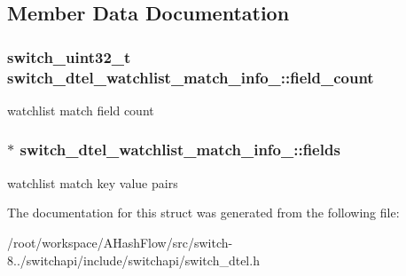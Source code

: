 \subsection{Member Data Documentation}
\hypertarget{structswitch__dtel__watchlist__match__info___a5f5429cd7a0407a75037779fe4ce6d39}{
\subsubsection[{field\+\_\+count}]{\setlength{\rightskip}{0pt plus 5cm}switch\+\_\+uint32\+\_\+t switch\+\_\+dtel\+\_\+watchlist\+\_\+match\+\_\+info\+\_\+\+::field\+\_\+count}}\label{structswitch__dtel__watchlist__match__info___a5f5429cd7a0407a75037779fe4ce6d39}
watchlist match field count \hypertarget{structswitch__dtel__watchlist__match__info___a6bce3a0c9c39f62983d8a9ed30af35b3}{
\subsubsection[{fields}]{$\ast$ switch\+\_\+dtel\+\_\+watchlist\+\_\+match\+\_\+info\+\_\+\+::fields}}\label{structswitch__dtel__watchlist__match__info___a6bce3a0c9c39f62983d8a9ed30af35b3}
watchlist match key value pairs 

The documentation for this struct was generated from the following file\+:\begin{DoxyCompactItemize}
\item 
/root/workspace/\+A\+Hash\+Flow/src/switch-\/8../switchapi/include/switchapi/switch\+\_\+dtel.\+h\end{DoxyCompactItemize}
